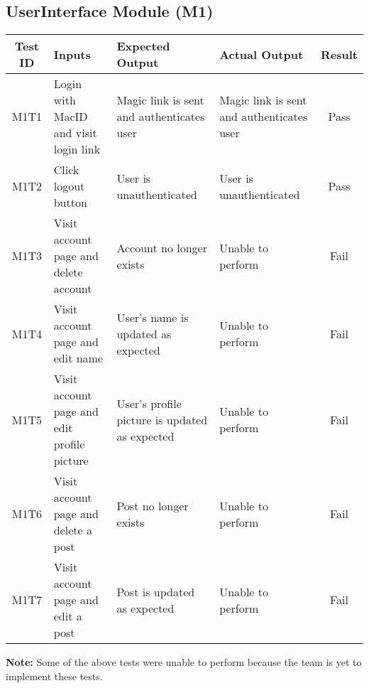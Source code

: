 \documentclass[fullpage]{article}
\begin{document}
\subsection{UserInterface Module (M1)}
\begin{table}[H]
\flushleft
\begin{tabular}{|c|p{4.5cm}|p{3.6cm}|p{3.6cm}|c|}
\hline
 \rowcolor{lightgray} 
\textbf{Test ID} &\textbf{Inputs} &\textbf{Expected Output} &\textbf{Actual Output} &\textbf{Result}\\
\hline
M1T1 & Login with MacID and visit login link & Magic link is sent and authenticates user & Magic link is sent and authenticates user & Pass \\
\hline
M1T2 & Click logout button & User is unauthenticated & User is unauthenticated & Pass \\
\hline
M1T3 & Visit account page and delete account & Account no longer exists & Unable to perform & Fail \\
\hline
M1T4 & Visit account page and edit name & User's name is updated as expected & Unable to perform & Fail \\
\hline
M1T5 & Visit account page and edit profile picture & User's profile picture is updated as expected & Unable to perform & Fail \\
\hline
M1T6 & Visit account page and delete a post & Post no longer exists & Unable to perform & Fail \\
\hline
M1T7 & Visit account page and edit a post & Post is updated as expected & Unable to perform & Fail \\
\hline
\end{tabular}
\end{table}
\textbf{Note: }Some of the above tests were unable to perform because the team is yet to implement these tests.
\end{document}
